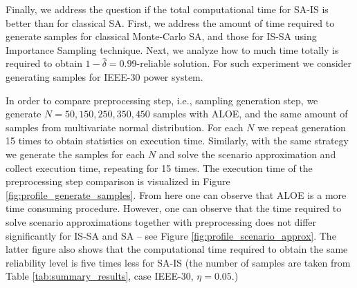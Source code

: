 Finally, we address the question if the total computational time for SA-IS is better than for classical SA. First, we address the amount of time required to generate samples for classical Monte-Carlo SA, and those for IS-SA using Importance Sampling technique. Next, we analyze how to much time totally is required to obtain $1-\hat{\delta}=0.99$-reliable solution. For such experiment we consider generating samples for IEEE-30 power system. 

In order to compare preprocessing step, i.e., sampling generation step, we generate $N=50, 150, 250, 350, 450$ samples with ALOE, and the same amount of samples from multivariate normal distribution. For each $N$ we repeat generation 15 times to obtain statistics on execution time. Similarly, with the same strategy we generate the samples for each $N$ and solve the scenario approximation and collect execution time, repeating for 15 times. 
The execution time of the preprocessing step comparison is visualized in Figure \ref{fig:profile_generate_samples}. From here one can observe that ALOE is a more time consuming procedure. However, one can observe that the time required to solve scenario approximations together with preprocessing does not differ significantly for IS-SA and SA -- see Figure \ref{fig:profile_scenario_approx}. The latter figure also shows that the computational time required to obtain the same reliability level is five times less for SA-IS (the number of samples are taken from Table \ref{tab:summary_results}, case IEEE-30, $\eta=0.05$.)

